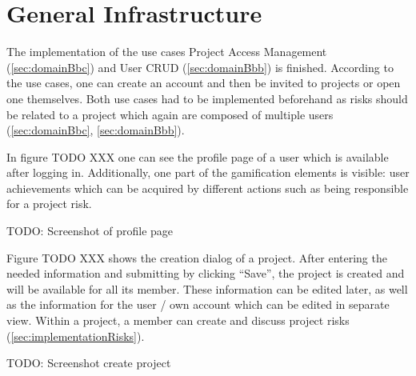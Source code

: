 \section{General Infrastructure}
\label{sec:implementationInfra}

The implementation of the use cases Project Access Management (\ref{sec:domainBbc}) and User CRUD (\ref{sec:domainBbb}) is finished. According to the use cases, one can create an account and then be invited to projects or open one themselves. Both use cases had to be implemented beforehand as risks should be related to a project which again are composed of multiple users (\ref{sec:domainBbc}, \ref{sec:domainBbb}).

In figure TODO XXX one can see the profile page of a user which is available after logging in. Additionally, one part of the gamification elements is visible: user achievements which can be acquired by different actions such as being responsible for a project risk.

TODO: Screenshot of profile page

Figure TODO XXX shows the creation dialog of a project. After entering the needed information and submitting by clicking “Save”, the project is created and will be available for all its member. These information can be edited later, as well as the information for the user / own account which can be edited in separate view. Within a project, a member can create and discuss project risks (\ref{sec:implementationRisks}).

TODO: Screenshot create project


